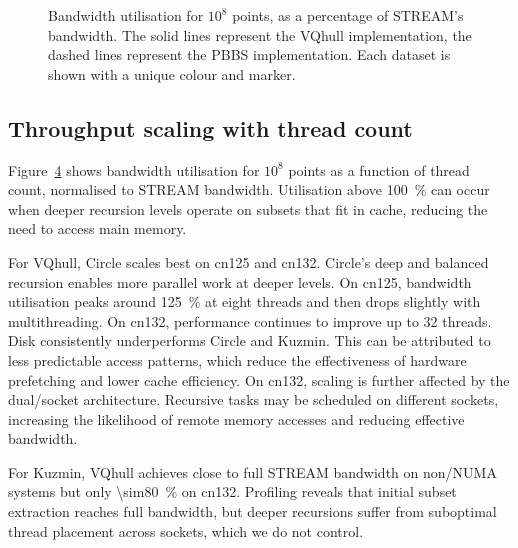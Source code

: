 \begin{figure}[t]
  \scriptsize
  \begin{subfigure}[b]{0.33\linewidth}
    \centering
    \label{fig:bw-cn125}%
  \end{subfigure}%
  \hfill
  \begin{subfigure}[b]{0.33\linewidth}
    \centering
    \label{fig:bw-cn132}%
  \end{subfigure}%
  \hfill
  \begin{subfigure}[b]{0.33\linewidth}
    \centering
    \label{fig:bw-laptop}%
  \end{subfigure}%
  \caption{Bandwidth utilisation for $10^8$ points, as a percentage of STREAM's bandwidth.
  The solid lines represent the VQhull implementation, the dashed lines represent the PBBS implementation.
  Each dataset is shown with a unique colour and marker.}%
  \label{fig:bw}%
\end{figure}

\subsection{Throughput scaling with thread count}
Figure~\ref{fig:bw} shows bandwidth utilisation for $10^8$ points as a function of thread count, normalised to STREAM bandwidth.
Utilisation above \qty{100}{\percent} can occur when deeper recursion levels operate on subsets that fit in cache, reducing the need to access main memory.

For VQhull, Circle scales best on cn125 and cn132.
Circle's deep and balanced recursion enables more parallel work at deeper levels.
On cn125, bandwidth utilisation peaks around \qty{125}{\percent} at eight threads and then drops slightly with multithreading.
On cn132, performance continues to improve up to 32 threads.
Disk consistently underperforms Circle and Kuzmin.
This can be attributed to less predictable access patterns, which reduce the effectiveness of hardware prefetching and lower cache efficiency.
On cn132, scaling is further affected by the dual\-/socket architecture.
Recursive tasks may be scheduled on different sockets, increasing the likelihood of remote memory accesses and reducing effective bandwidth.

For Kuzmin, VQhull achieves close to full STREAM bandwidth on non\-/NUMA systems but only \qty{\sim80}{\percent} on cn132.
Profiling reveals that initial subset extraction reaches full bandwidth, but deeper recursions suffer from suboptimal thread placement across sockets, which we do not control.

